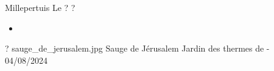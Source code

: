 \ficheidentiteplante
{Millepertuis}
{%
    Le  
}
{%
    ?
}
{%
    ?
}
{%
    \begin{itemize}[label = \bcplume]
        \item 
    \end{itemize}
}
{%
    ?
}
{%
    sauge_de_jerusalem.jpg
}
{%
    Sauge de Jérusalem
}
{%
    Jardin des thermes de  - 04/08/2024 
}